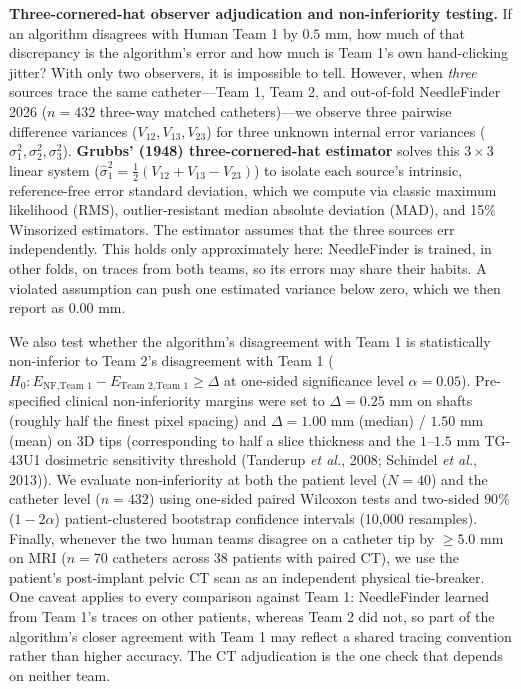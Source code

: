 \documentclass[
  11pt,
]{article}
\begin{document}
\textbf{Three-cornered-hat observer adjudication and non-inferiority
testing.} If an algorithm disagrees with Human Team 1 by
\(0.5\text{ mm}\), how much of that discrepancy is the algorithm's error
and how much is Team 1's own hand-clicking jitter? With only two
observers, it is impossible to tell. However, when \emph{three} sources
trace the same catheter---Team 1, Team 2, and out-of-fold NeedleFinder
2026 (\(n = 432\) three-way matched catheters)---we observe three
pairwise difference variances (\(V_{12}, V_{13}, V_{23}\)) for three
unknown internal error variances
(\(\sigma_1^2, \sigma_2^2, \sigma_3^2\)). \textbf{Grubbs' (1948)
three-cornered-hat estimator} solves this \(3 \times 3\) linear system
(\(\hat{\sigma}_1^2 = \frac{1}{2}(V_{12} + V_{13} - V_{23})\)) to
isolate each source's intrinsic, reference-free error standard
deviation, which we compute via classic maximum likelihood (RMS),
outlier-resistant median absolute deviation (MAD), and 15\% Winsorized
estimators. The estimator assumes that the three sources err
independently. This holds only approximately here: NeedleFinder is
trained, in other folds, on traces from both teams, so its errors may
share their habits. A violated assumption can push one estimated
variance below zero, which we then report as 0.00 mm.

We also test whether the algorithm's disagreement with Team 1 is
statistically non-inferior to Team 2's disagreement with Team 1
(\(H_0: E_{\text{NF},\text{Team 1}} - E_{\text{Team 2},\text{Team 1}} \ge \Delta\)
at one-sided significance level \(\alpha = 0.05\)). Pre-specified
clinical non-inferiority margins were set to \(\Delta = 0.25\text{ mm}\)
on shafts (roughly half the finest pixel spacing) and
\(\Delta = 1.00\text{ mm}\) (median) / \(1.50\text{ mm}\) (mean) on 3D
tips (corresponding to half a slice thickness and the
\(1\text{--}1.5\text{ mm}\) TG-43U1 dosimetric sensitivity threshold
(Tanderup \emph{et al.}, 2008; Schindel \emph{et al.}, 2013)). We
evaluate non-inferiority at both the patient level (\(N = 40\)) and the
catheter level (\(n = 432\)) using one-sided paired Wilcoxon tests and
two-sided \(90\%\) (\(1 - 2\alpha\)) patient-clustered bootstrap
confidence intervals (10,000 resamples). Finally, whenever the two human
teams disagree on a catheter tip by \(\ge 5.0\text{ mm}\) on MRI
(\(n = 70\) catheters across 38 patients with paired CT), we use the
patient's post-implant pelvic CT scan as an independent physical
tie-breaker. One caveat applies to every comparison against Team 1:
NeedleFinder learned from Team 1's traces on other patients, whereas
Team 2 did not, so part of the algorithm's closer agreement with Team 1
may reflect a shared tracing convention rather than higher accuracy. The
CT adjudication is the one check that depends on neither team.
\end{document}
